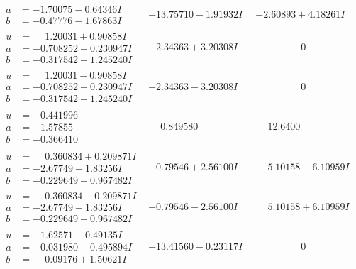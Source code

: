 \documentclass[1p]{elsarticle_modified}
\theoremstyle{definition}
\begin{document}
$$\begin{array}{c|c|c}
\begin{aligned}
a &= -1.70075 - 0.64346 I \\
b &= -0.47776 - 1.67863 I\end{aligned}
 & -13.75710 - 1.91932 I & -2.60893 + 4.18261 I \\ \hline\begin{aligned}
u &= \phantom{-}1.20031 + 0.90858 I \\
a &= -0.708252 - 0.230947 I \\
b &= -0.317542 - 1.245240 I\end{aligned}
 & -2.34363 + 3.20308 I & \phantom{-0.000000 } 0 \\ \hline\begin{aligned}
u &= \phantom{-}1.20031 - 0.90858 I \\
a &= -0.708252 + 0.230947 I \\
b &= -0.317542 + 1.245240 I\end{aligned}
 & -2.34363 - 3.20308 I & \phantom{-0.000000 } 0 \\ \hline\begin{aligned}
u &= -0.441996\phantom{ +0.000000I} \\
a &= -1.57855\phantom{ +0.000000I} \\
b &= -0.366410\phantom{ +0.000000I}\end{aligned}
 & \phantom{-}0.849580\phantom{ +0.000000I} & \phantom{-}12.6400\phantom{ +0.000000I} \\ \hline\begin{aligned}
u &= \phantom{-}0.360834 + 0.209871 I \\
a &= -2.67749 + 1.83256 I \\
b &= -0.229649 - 0.967482 I\end{aligned}
 & -0.79546 + 2.56100 I & \phantom{-}5.10158 - 6.10959 I \\ \hline\begin{aligned}
u &= \phantom{-}0.360834 - 0.209871 I \\
a &= -2.67749 - 1.83256 I \\
b &= -0.229649 + 0.967482 I\end{aligned}
 & -0.79546 - 2.56100 I & \phantom{-}5.10158 + 6.10959 I \\ \hline\begin{aligned}
u &= -1.62571 + 0.49135 I \\
a &= -0.031980 + 0.495894 I \\
b &= \phantom{-}0.09176 + 1.50621 I\end{aligned}
 & -13.41560 - 0.23117 I & \phantom{-0.000000 } 0\\

\end{array}$$
\end{document}
